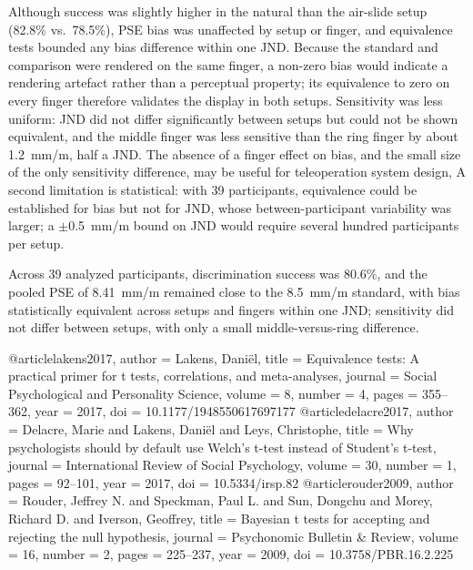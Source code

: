 Although success was slightly higher in the natural than the air-slide setup (82.8\% vs.\ 78.5\%), PSE bias was unaffected by setup or finger, and equivalence tests bounded any bias difference within one JND. Because the standard and comparison were rendered on the same finger, a non-zero bias would indicate a rendering artefact rather than a perceptual property; its equivalence to zero on every finger therefore validates the display in both setups. Sensitivity was less uniform: JND did not differ significantly between setups but could not be shown equivalent, and the middle finger was less sensitive than the ring finger by about 1.2~mm/m, half a JND.
The absence of a finger effect on bias, and the small size of the only sensitivity difference, may be useful for teleoperation system design,
A second limitation is statistical: with 39 participants, equivalence could be established for bias but not for JND, whose between-participant variability was larger; a $\pm$0.5~mm/m bound on JND would require several hundred participants per setup.

Across 39 analyzed participants, discrimination success was 80.6\%, and the pooled PSE of 8.41~mm/m remained close to the 8.5~mm/m standard, with bias statistically equivalent across setups and fingers within one JND; sensitivity did not differ between setups, with only a small middle-versus-ring difference.

@article{lakens2017,
  author  = {Lakens, Dani{\"e}l},
  title   = {Equivalence tests: A practical primer for t tests, correlations, and meta-analyses},
  journal = {Social Psychological and Personality Science},
  volume  = {8}, number = {4}, pages = {355--362}, year = {2017},
  doi     = {10.1177/1948550617697177}}
@article{delacre2017,
  author  = {Delacre, Marie and Lakens, Dani{\"e}l and Leys, Christophe},
  title   = {Why psychologists should by default use {Welch}'s t-test instead of {Student}'s t-test},
  journal = {International Review of Social Psychology},
  volume  = {30}, number = {1}, pages = {92--101}, year = {2017},
  doi     = {10.5334/irsp.82}}
@article{rouder2009,
  author  = {Rouder, Jeffrey N. and Speckman, Paul L. and Sun, Dongchu and Morey, Richard D. and Iverson, Geoffrey},
  title   = {Bayesian t tests for accepting and rejecting the null hypothesis},
  journal = {Psychonomic Bulletin \& Review},
  volume  = {16}, number = {2}, pages = {225--237}, year = {2009},
  doi     = {10.3758/PBR.16.2.225}}
